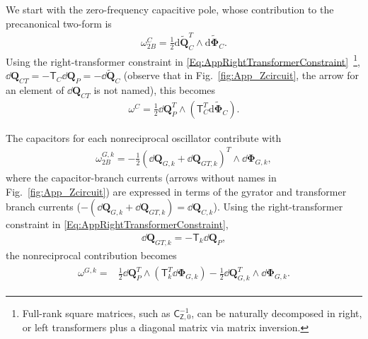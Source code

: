\documentclass[prx,aps,twocolumn,article]{revtex4-2}
\newcommand{\msf}[1]{\mathsf{#1}}
\newcommand{\bsb}[1]{\boldsymbol{#1}}
\newcommand{\bPhi}{\bsb{\Phi}}
\newcommand{\bQ}{\bsb{Q}}
\newcommand{\dbQ}{\dd\bQ}
\newcommand{\dbPhi}{\dd\bPhi}
\newcommand{\msT}{\msf{T}}
\newcommand{\msZ}{\msf{Z}}
\newcommand{\msC}{\msf{C}}
\begin{document}
We start with the zero-frequency capacitive pole, whose contribution
to the precanonical  two-form is
\begin{align}
    \omega^C_{2B}
    =
    \frac{1}{2}
    \mathrm{d}\tilde{\bQ}_C^T
    \wedge
    \mathrm{d}\tilde{\bPhi}_C.
\end{align}
Using the right-transformer constraint in
\cref{Eq:AppRightTransformerConstraint}~\footnote{Full-rank square matrices, such as $\msC_{\msZ,0}^{-1}$, can be naturally decomposed in right, or left transformers plus a diagonal matrix via matrix inversion.}, $\dbQ_{CT}=-\msT_C\dbQ_P=-\dd\tilde{\bQ}_C$ (observe that in Fig.~\ref{fig:App_Zcircuit}, the arrow for an element of $\dbQ_{CT}$ is not named), 
this becomes
\begin{align}
    \omega^C
    =
    \frac{1}{2}
    \dbQ_P^T
    \wedge
    \left(
        \msT_C^T
        \mathrm{d}\tilde{\bPhi}_C
    \right).
\end{align}

The capacitors for each nonreciprocal oscillator contribute with 
\begin{align}
    \omega_{2B}^{G,k}
    =
    -\frac{1}{2}
    \left(
        \dbQ_{G,k}
        +
        \dbQ_{GT,k}
    \right)^T
    \wedge
    \dbPhi_{G,k},
\end{align}
where the capacitor-branch currents (arrows without names in Fig.~\ref{fig:App_Zcircuit}) are expressed in terms of the gyrator and transformer branch currents ($-\left(
        \dbQ_{G,k}
        +
        \dbQ_{GT,k}
    \right)=\dbQ_{C,k}$). Using the right-transformer constraint in \cref{Eq:AppRightTransformerConstraint}, 
\begin{align}
    \dbQ_{GT,k}
    =
    -\msT_k\dbQ_P,
    \label{Eq:TransformerCurrentConstraint}
\end{align}
the nonreciprocal contribution becomes
\begin{align}
\label{eq:w_Gk_Z_init}
\begin{aligned}
    \omega^{G,k}
    ={}&\frac{1}{2}
    \dbQ_P^T
    \wedge
    \left(
        \msT_k^T
        \dbPhi_{G,k}
    \right)    -\frac{1}{2}
    \dbQ_{G,k}^T
    \wedge
    \dbPhi_{G,k}
    .
\end{aligned}
\end{align}
\end{document}
